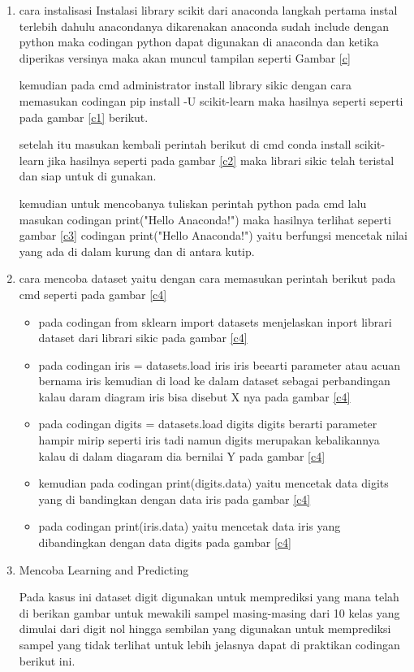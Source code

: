 \begin{enumerate}
\item 
cara instalisasi Instalasi library scikit dari anaconda langkah pertama instal terlebih dahulu anacondanya dikarenakan anaconda sudah include dengan python maka codingan python dapat digunakan di anaconda dan ketika diperikas versinya maka akan muncul tampilan seperti Gambar \ref{c}

kemudian pada cmd administrator install library sikic dengan cara memasukan codingan pip install -U scikit-learn maka hasilnya seperti seperti pada gambar \ref{c1} berikut.

setelah itu masukan kembali perintah berikut di cmd conda install scikit-learn jika hasilnya seperti pada gambar \ref{c2} maka librari sikic telah teristal dan siap untuk di gunakan.

kemudian untuk mencobanya tuliskan perintah python pada cmd lalu masukan codingan print("Hello Anaconda!") maka hasilnya terlihat seperti gambar \ref{c3} codingan print("Hello Anaconda!") yaitu berfungsi mencetak nilai yang ada di dalam kurung dan di antara kutip.


\item
cara mencoba dataset yaitu dengan cara memasukan perintah berikut pada cmd seperti pada gambar \ref{c4} 

\begin{itemize}
\item
pada codingan from sklearn import datasets menjelaskan inport librari dataset dari librari sikic pada gambar \ref{c4}
\item
pada codingan iris = datasets.load iris iris beearti parameter atau acuan bernama iris kemudian di load ke dalam dataset sebagai perbandingan kalau daram diagram iris bisa disebut X nya pada gambar \ref{c4}
\item 
pada codingan digits = datasets.load digits digits berarti parameter hampir mirip seperti iris tadi namun digits merupakan kebalikannya kalau di dalam diagaram dia bernilai Y pada gambar \ref{c4}
\item
kemudian pada codingan print(digits.data) yaitu mencetak data digits yang di bandingkan dengan data iris pada gambar \ref{c4}
\item 
pada codingan print(iris.data) yaitu mencetak data iris yang dibandingkan dengan data digits pada gambar \ref{c4}
\end{itemize}
\item
Mencoba Learning and Predicting\par
Pada kasus ini dataset digit digunakan untuk memprediksi yang mana telah di berikan gambar untuk mewakili sampel masing-masing dari 10 kelas yang dimulai dari digit nol hingga sembilan yang digunakan untuk memprediksi sampel yang tidak terlihat untuk lebih jelasnya dapat di praktikan codingan berikut ini.


\end{enumerate}
